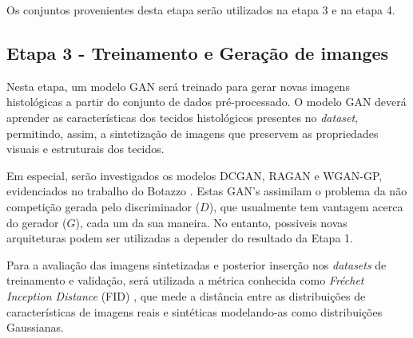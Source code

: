   Os conjuntos provenientes desta etapa serão utilizados na etapa 3 e na etapa 4. 

\subsection{Etapa 3 - Treinamento e Geração de imanges}

Nesta etapa, um modelo GAN será treinado para gerar novas imagens histológicas a partir do conjunto de dados pré-processado. O modelo GAN deverá aprender as características dos tecidos histológicos presentes no \textit{dataset}, permitindo, assim, a sintetização de imagens que preservem as propriedades visuais e estruturais dos tecidos.

Em especial, serão investigados os modelos DCGAN, RAGAN e WGAN-GP, evidenciados no trabalho do Botazzo \cite{rozendo2024histdataaug}. Estas GAN's assimilam o problema da não competição gerada pelo discriminador ($D$), que usualmente tem vantagem acerca do gerador ($G$), cada um da sua maneira. No entanto, possiveis novas arquiteturas podem ser utilizadas a depender do resultado da Etapa 1.

Para a avaliação das imagens sintetizadas e posterior inserção nos \textit{datasets} de treinamento e validação, será utilizada a métrica conhecida como \textit{Fréchet Inception Distance} (FID) \cite{heusel2018ganstrainedtimescaleupdate}, que mede a distância entre as distribuições de características de imagens reais e sintéticas modelando-as como distribuições Gaussianas.

